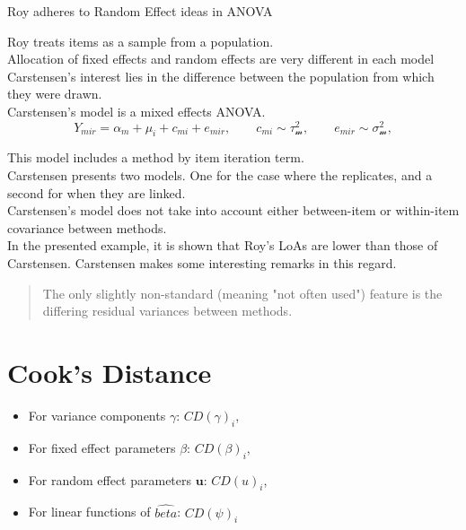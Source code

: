 \documentclass[12pt, a4paper]{article}
\begin{document}
Roy adheres to Random Effect ideas in ANOVA

Roy treats items as a sample from a population.\\

Allocation of fixed effects and random effects are very different in each model\\

Carstensen's interest lies in the difference between the population from which they were drawn.\\

Carstensen's model is a mixed effects ANOVA.\\

\[
Y_{mir}  =  \alpha_m + \mu_i + c_{mi} + e_{mir}, \qquad c_{mi} \sim \mathcal{\tau^2_m}, \qquad e_{mir} \sim \mathcal{\sigma^2_m},
\]

This model includes a method by item iteration term.\\

Carstensen presents two models. One for the case where the replicates, and a second for when they are linked.\\

Carstensen's model does not take into account either between-item or within-item covariance between methods.\\


In the presented example, it is shown that Roy's LoAs are lower than those of Carstensen.
Carstensen makes some interesting remarks in this regard.

\begin{quote}
	The only slightly non-standard (meaning "not often used") feature is the differing residual variances between methods.
\end{quote}

\section{Cook's Distance}
\begin{itemize}
	\item For variance components $\gamma$: $CD(\gamma)_i$,
	\item For fixed effect parameters $\beta$: $CD(\beta)_i$,
	\item For random effect parameters $\boldsymbol{u}$: $CD(u)_i$,
	\item For linear functions of $\hat{beta}$: $CD(\psi)_i$
\end{itemize}
\end{document}
